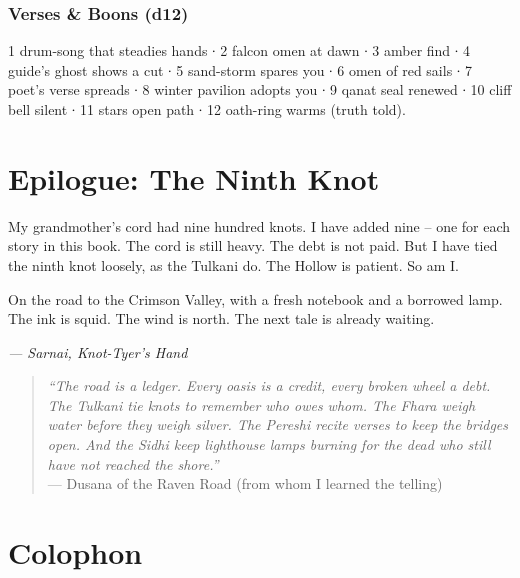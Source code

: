 \documentclass[12pt,oneside]{book}
\begin{document}
\subsection*{Verses \& Boons (d12)}
1 drum-song that steadies hands ∙ 2 falcon omen at dawn ∙ 3 amber find ∙ 4 guide's ghost shows a cut ∙ 5 sand-storm spares you ∙ 6 omen of red sails ∙ 7 poet's verse spreads ∙ 8 winter pavilion adopts you ∙ 9 qanat seal renewed ∙ 10 cliff bell silent ∙ 11 stars open path ∙ 12 oath-ring warms (truth told).

\chapter*{Epilogue: The Ninth Knot}

My grandmother's cord had nine hundred knots. I have added nine -- one for each story in this book. The cord is still heavy. The debt is not paid. But I have tied the ninth knot loosely, as the Tulkani do. The Hollow is patient. So am I.

On the road to the Crimson Valley, with a fresh notebook and a borrowed lamp. The ink is squid. The wind is north. The next tale is already waiting.

\vspace{1em}
\noindent\textit{--- Sarnai, Knot-Tyer's Hand}

\vspace{2em}
\begin{quote}
  \small
  \textit{``The road is a ledger. Every oasis is a credit, every broken wheel a debt. The Tulkani tie knots to remember who owes whom. The Fhara weigh water before they weigh silver. The Pereshi recite verses to keep the bridges open. And the Sidhi keep lighthouse lamps burning for the dead who still have not reached the shore.''}
  \\ --- Dusana of the Raven Road (from whom I learned the telling)
\end{quote}

\chapter*{Colophon}
\end{document}
